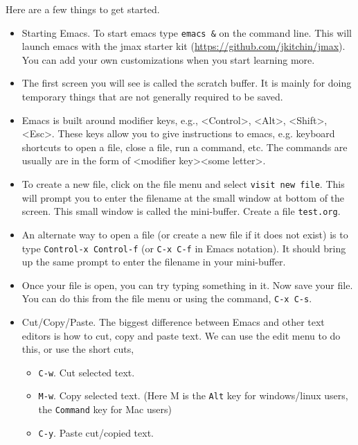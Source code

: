 \documentclass[11pt]{article}
\begin{document}
Here are a few things to get started.

\begin{itemize}
\item Starting Emacs. To start emacs type \texttt{emacs \&} on the command line. This will launch emacs with the jmax starter kit (\url{https://github.com/jkitchin/jmax}). You can add your own customizations when you start learning more.

\item The first screen you will see is called the scratch buffer. It is mainly for doing temporary things that are not generally required to be saved.

\item Emacs is built around modifier keys, e.g., <Control>, <Alt>, <Shift>, <Esc>. These keys allow you to give instructions to emacs, e.g. keyboard shortcuts to open a file, close a file, run a command, etc. The commands are usually are in the form of <modifier key><some letter>.

\item To create a new file, click on the file menu and select \texttt{visit new file}. This will prompt you to enter the filename at the small window at bottom of the screen. This small window is called the mini-buffer. Create a file \texttt{test.org}.

\item An alternate way to open a file (or create a new file if it does not exist) is to type \texttt{Control-x Control-f} (or \texttt{C-x C-f} in Emacs notation). It should bring up the same prompt to enter the filename in your mini-buffer.

\item Once your file is open, you can try typing something in it. Now save your file. You can do this from the file menu or using the command, \texttt{C-x C-s}.

\item Cut/Copy/Paste. The biggest difference between Emacs and other text editors is how to cut, copy and paste text. We can use the edit menu to do this, or use the short cuts,

\begin{itemize}
\item \texttt{C-w}. Cut selected text.
\item \texttt{M-w}. Copy selected text. (Here M is the \texttt{Alt} key for windows/linux users, the \texttt{Command} key for Mac users)
\item \texttt{C-y}. Paste cut/copied text.
\end{itemize}


\end{itemize}
\end{document}
